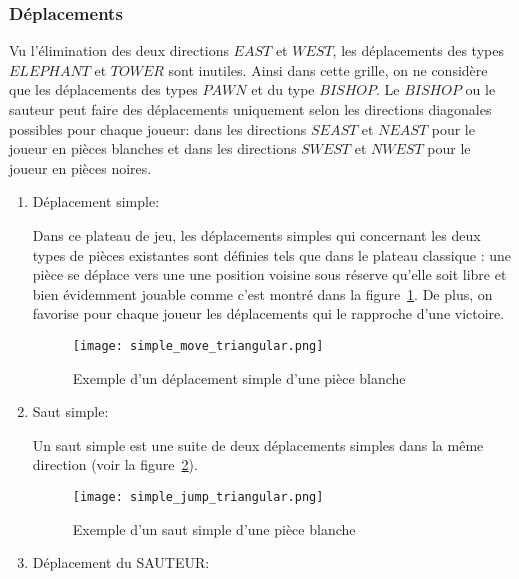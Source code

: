 \documentclass[11pt]{article}
\begin{document}
            \subsubsection{Déplacements}
            Vu l'élimination des deux directions $EAST$ et $WEST$, les déplacements des types $ELEPHANT$ et $TOWER$ sont inutiles. Ainsi dans cette grille, on ne considère que les déplacements des types $PAWN$ et du type $BISHOP$. Le $BISHOP$ ou le sauteur peut faire des déplacements uniquement selon les directions diagonales possibles pour chaque joueur: dans les directions $SEAST$ et $NEAST$ pour le joueur en pièces blanches et dans les directions $SWEST$ et $NWEST$ pour le joueur en pièces noires.
                \begin{enumerate}
                    \item Déplacement simple:
                    
                        Dans ce plateau de jeu, les déplacements simples qui concernant les deux types de pièces existantes sont définies tels que dans le plateau classique : une pièce se déplace vers une une position voisine sous réserve qu'elle soit libre et bien évidemment jouable comme c'est montré dans la figure~\ref{figure25}. De plus, on favorise pour chaque joueur les déplacements qui le rapproche d'une victoire. 
                        \begin{figure}[h]
                                \centering
                                \texttt{[image: simple\_move\_triangular.png]}
                                \caption{ Exemple d'un déplacement simple d'une pièce blanche }
                                \label{figure25}
                                \end{figure}
                    \item Saut simple:
                    
                        Un saut simple est une suite de deux déplacements simples dans la même direction (voir la figure~\ref{figure26}).
                        \begin{figure}[h]
                                \centering
                                \texttt{[image: simple\_jump\_triangular.png]}
                                \caption{ Exemple d'un saut simple d'une pièce blanche }
                                \label{figure26}
                                \end{figure}
                    \item Déplacement du SAUTEUR:
                    

\end{enumerate}
\end{document}
